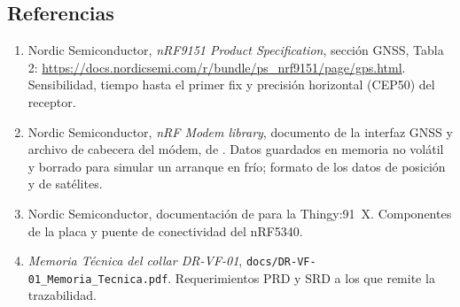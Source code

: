 \subsection{Referencias}

\begin{enumerate}
  \item Nordic Semiconductor, \emph{nRF9151 Product Specification}, sección GNSS, Tabla 2:
        \url{https://docs.nordicsemi.com/r/bundle/ps_nrf9151/page/gps.html}. Sensibilidad, tiempo hasta el primer fix y
        precisión horizontal (CEP50) del receptor.
  \item Nordic Semiconductor, \emph{nRF Modem library}, documento de la interfaz GNSS y archivo de cabecera
        del módem, de \dNcs{}. Datos guardados en memoria no volátil y borrado para simular un
        arranque en frío; formato de los datos de posición y de satélites.
  \item Nordic Semiconductor, documentación de \dNcs{} para la Thingy:91~X. Componentes de la placa y puente de
        conectividad del nRF5340.
  \item \emph{Memoria Técnica del collar DR-VF-01}, \texttt{docs/DR-VF-01\_Memoria\_Tecnica.pdf}. Requerimientos
        PRD y SRD a los que remite la trazabilidad.
\end{enumerate}
